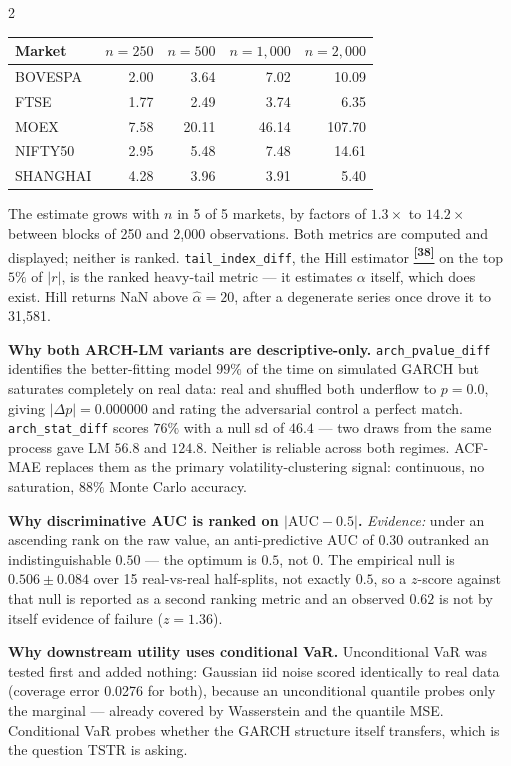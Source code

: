 \documentclass[10pt]{article}
\newcommand{\tcite}[1]{%
  \hyperlink{R:#1}{\textsuperscript{\scriptsize\textbf{[#1]}}}}
\begin{document}
\begin{multicols}{2}
\smallskip
{\footnotesize
\begin{tabular}{@{}lrrrr@{}}
\toprule
Market & $n=250$ & $n=500$ & $n=1{,}000$ & $n=2{,}000$ \\
\midrule
BOVESPA & 2.00 & 3.64 & 7.02 & 10.09 \\
FTSE & 1.77 & 2.49 & 3.74 & 6.35 \\
MOEX & 7.58 & 20.11 & 46.14 & 107.70 \\
NIFTY50 & 2.95 & 5.48 & 7.48 & 14.61 \\
SHANGHAI & 4.28 & 3.96 & 3.91 & 5.40 \\
\bottomrule
\end{tabular}}

\smallskip
The estimate grows with $n$ in 5 of 5 markets, by factors of \(1.3\times\) to \(14.2\times\) between blocks of 250 and 2,000 observations. Both metrics are computed and displayed; neither is ranked. \texttt{tail\_index\_diff}, the Hill estimator\tcite{38} on the top $5\%$ of $|r|$, is the ranked heavy-tail metric --- it estimates $\alpha$ itself, which does exist. Hill returns NaN above $\hat\alpha=20$, after a degenerate series once drove it to 31{,}581.

\columnbreak

\textbf{Why both ARCH-LM variants are descriptive-only.}
\texttt{arch\_pvalue\_diff} identifies the better-fitting model $99\%$ of the time on simulated GARCH but saturates completely on real data: real and shuffled both underflow to $p=0.0$, giving $|\Delta p|=0.000000$ and rating the adversarial control a perfect match. \texttt{arch\_stat\_diff} scores $76\%$ with a null sd of $46.4$ --- two draws from the same process gave LM $56.8$ and $124.8$. Neither is reliable across both regimes. ACF-MAE replaces them as the primary volatility-clustering signal: continuous, no saturation, $88\%$ Monte Carlo accuracy.

\smallskip
\textbf{Why discriminative AUC is ranked on $|\text{AUC}-0.5|$.}
\textit{Evidence:} under an ascending rank on the raw value, an anti-predictive AUC of $0.30$ outranked an indistinguishable $0.50$ --- the optimum is $0.5$, not $0$. The empirical null is $0.506\pm0.084$ over 15 real-vs-real half-splits, not exactly $0.5$, so a $z$-score against that null is reported as a second ranking metric and an observed $0.62$ is not by itself evidence of failure ($z=1.36$).

\smallskip
\textbf{Why downstream utility uses conditional VaR.}
Unconditional VaR was tested first and added nothing: Gaussian iid noise scored identically to real data (coverage error 0.0276 for both), because an unconditional quantile probes only the marginal --- already covered by Wasserstein and the quantile MSE. Conditional VaR probes whether the GARCH structure itself transfers, which is the question TSTR is asking.


\end{multicols}
\end{document}
